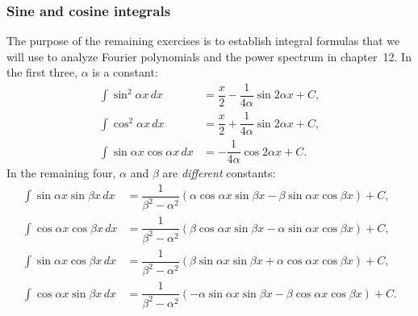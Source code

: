 \subsubsection{Sine and cosine integrals}
\label{subsubsec:sine-and-cosine-integrals}

The purpose of the remaining exercises is to establish integral
formulas that we will use to analyze Fourier polynomials and the power
spectrum in chapter~12.  In the first three, $\alpha$ is a constant:
\begin{align*}
\int \sin^2{\alpha x}\,dx &= \dfrac{x}{2} 
	- \dfrac{1}{4\alpha}\sin{2\alpha x} + C,  \\
\int \cos^2{\alpha x}\,dx &= \dfrac{x}{2} 
	+ \dfrac{1}{4\alpha}\sin{2\alpha x} + C,  \\
\int \sin{\alpha x}\cos{\alpha x}\,dx &=  
	- \dfrac{1}{4\alpha}\cos{2\alpha x} + C.
\end{align*}
In the remaining four, $\alpha$ and $\beta$ are {\em different\/} constants:
\begin{align*}
\int \sin{\alpha x} \sin{\beta x}\,dx &= \dfrac{1}{\beta^2-\alpha^2}
	\left(\alpha\cos{\alpha x}\sin{\beta x} - \beta\sin{\alpha x}
	\cos{\beta x}\right) + C, \\
\int \cos{\alpha x} \cos{\beta x}\,dx &= \dfrac{1}{\beta^2-\alpha^2}
	\left(\beta\cos{\alpha x}\sin{\beta x} - \alpha\sin{\alpha x}
	\cos{\beta x}\right) + C, \\
\int \sin{\alpha x} \cos{\beta x}\,dx &= \dfrac{1}{\beta^2-\alpha^2}
	\left(\beta\sin{\alpha x}\sin{\beta x} + \alpha\cos{\alpha x}
	\cos{\beta x}\right) + C, \\
\int \cos{\alpha x} \sin{\beta x}\,dx &=  \dfrac{1}{\beta^2-\alpha^2}
	\left(-\alpha\sin{\alpha x}\sin{\beta x} - \beta\cos{\alpha x}
	\cos{\beta x}\right) + C.
\end{align*}


